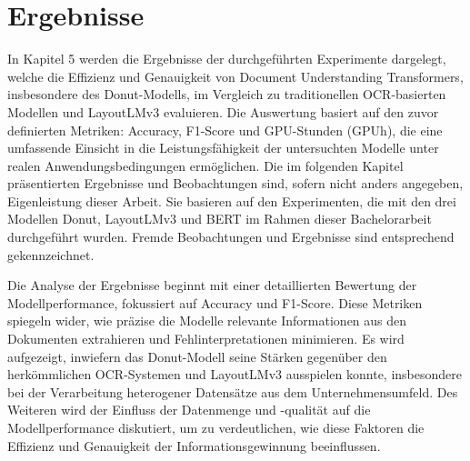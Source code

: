 \chapter{Ergebnisse}
In Kapitel 5 werden die Ergebnisse der durchgeführten Experimente dargelegt, welche die Effizienz und Genauigkeit von Document Understanding Transformers, insbesondere des Donut-Modells, im Vergleich zu traditionellen OCR-basierten Modellen und LayoutLMv3 evaluieren. Die Auswertung basiert auf den zuvor definierten Metriken: Accuracy, F1-Score und GPU-Stunden (GPUh), die eine umfassende Einsicht in die Leistungsfähigkeit der untersuchten Modelle unter realen Anwendungsbedingungen ermöglichen. Die im folgenden Kapitel präsentierten Ergebnisse und Beobachtungen sind, sofern nicht anders angegeben, Eigenleistung dieser Arbeit. Sie basieren auf den Experimenten, die mit den drei Modellen Donut, LayoutLMv3 und BERT im Rahmen dieser Bachelorarbeit durchgeführt wurden. Fremde Beobachtungen und Ergebnisse sind entsprechend gekennzeichnet.

Die Analyse der Ergebnisse beginnt mit einer detaillierten Bewertung der Modellperformance, fokussiert auf Accuracy und F1-Score. Diese Metriken spiegeln wider, wie präzise die Modelle relevante Informationen aus den Dokumenten extrahieren und Fehlinterpretationen minimieren. Es wird aufgezeigt, inwiefern das Donut-Modell seine Stärken gegenüber den herkömmlichen OCR-Systemen und LayoutLMv3 ausspielen konnte, insbesondere bei der Verarbeitung heterogener Datensätze aus dem Unternehmensumfeld. Des Weiteren wird der Einfluss der Datenmenge und -qualität auf die Modellperformance diskutiert, um zu verdeutlichen, wie diese Faktoren die Effizienz und Genauigkeit der Informationsgewinnung beeinflussen.

